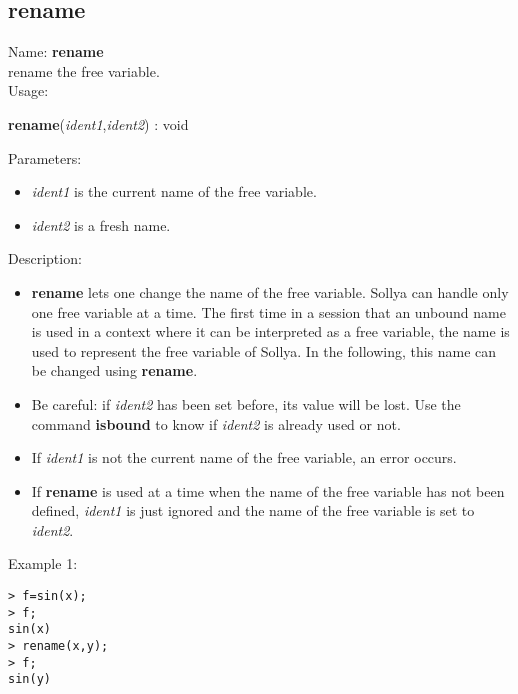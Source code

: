\subsection{rename}
\label{labrename}
\noindent Name: \textbf{rename}\\
rename the free variable.\\

\noindent Usage: 
\begin{center}
\textbf{rename}(\emph{ident1},\emph{ident2}) : \textsf{void}\\
\end{center}
Parameters: 
\begin{itemize}
\item \emph{ident1} is the current name of the free variable.
\item \emph{ident2} is a fresh name.
\end{itemize}
\noindent Description: \begin{itemize}

\item \textbf{rename} lets one change the name of the free variable. Sollya can handle only
   one free variable at a time. The first time in a session that an unbound name 
   is used in a context where it can be interpreted as a free variable, the name
   is used to represent the free variable of Sollya. In the following, this name
   can be changed using \textbf{rename}.

\item Be careful: if \emph{ident2} has been set before, its value will be lost. Use the 
   command \textbf{isbound} to know if \emph{ident2} is already used or not.

\item If \emph{ident1} is not the current name of the free variable, an error occurs.

\item If \textbf{rename} is used at a time when the name of the free variable has not been 
   defined, \emph{ident1} is just ignored and the name of the free variable is 
   set to \emph{ident2}.
\end{itemize}
\noindent Example 1: 
\begin{center}\begin{minipage}{15cm}\begin{Verbatim}[frame=single]
> f=sin(x);
> f;
sin(x)
> rename(x,y);
> f;
sin(y)
\end{Verbatim}
\end{minipage}\end{center}

